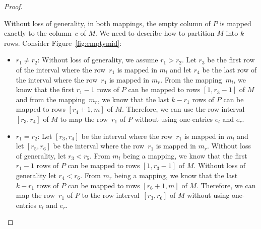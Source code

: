 \begin{proof}
\begin{itemize}
	Without loss of generality, in both mappings, the empty column of $P$ is mapped exactly to the column~$c$ of $M$. We need to describe how to partition $M$ into $k$ rows. Consider Figure~\ref{fig:emptymid}:
	\begin{itemize}
		\item $r_1\neq r_2$: Without loss of generality, we assume $r_1>r_2$. Let $r_3$ be the first row of the interval where the row~$r_1$ is mapped in $m_l$ and let $r_4$ be the last row of the interval where the row~$r_1$ is mapped in $m_r$. From the mapping~$m_l$, we know that the first $r_1-1$ rows of $P$ can be mapped to rows $[1,r_3-1]$ of $M$ and from the mapping~$m_r$, we know that the last $k-r_1$ rows of $P$ can be mapped to rows $[r_4+1,m]$ of $M$. Therefore, we can use the row interval $[r_3,r_4]$ of $M$ to map the row~$r_1$ of $P$ without using one-entries $e_l$ and $e_r$.
		\item $r_1=r_2$: Let $[r_3,r_4]$ be the interval where the row~$r_1$ is mapped in $m_l$ and let $[r_5,r_6]$ be the interval where the row~$r_1$ is mapped in $m_r$. Without loss of generality, let $r_3<r_5$. From $m_l$ being a mapping, we know that the first $r_1-1$ rows of $P$ can be mapped to rows $[1,r_3-1]$ of $M$. Without loss of generality let $r_4<r_6$. From $m_r$ being a mapping, we know that the last $k-r_1$ rows of $P$ can be mapped to rows $[r_6+1,m]$ of $M$. Therefore, we can map the row~$r_1$ of $P$ to the row interval~$[r_3,r_6]$ of $M$ without using one-entries $e_l$ and $e_r$.
	\end{itemize}
\end{itemize}


\end{proof}
